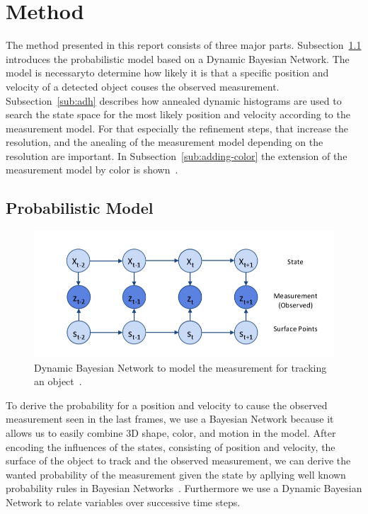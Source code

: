 \documentclass[twoside,a4paper,article]{combine}
\begin{document}
\section{Method}
\label{sec:method}
The method presented in this report consists of three major
parts. Subsection~\ref{sub:probabilistic-model} introduces the
probabilistic model based on a Dynamic Bayesian Network. The model is
necessaryto determine how likely it is that a specific position and
velocity of a detected object couses the observed
measurement. Subsection~\ref{sub:adh} describes how annealed dynamic
histograms are used to search the state space for the most likely
position and velocity according to the measurement model. For that
especially the refinement steps, that increase the resolution, and the
anealing of the measurement model depending on the resolution are
important. In Subsection~\ref{sub:adding-color} the extension of the
measurement model by color is shown~\cite{paper}.

\subsection{Probabilistic Model}
\label{sub:probabilistic-model}

\begin{figure}
  \center
  \includegraphics[width=.8\linewidth]{dbn}
  \caption{Dynamic Bayesian Network to model the measurement for
    tracking an object~\cite{paper}.}
  \label{fig:dbn}
\end{figure}

To derive the probability for a position and velocity to cause the
observed measurement seen in the last frames, we use a Bayesian
Network because it allows us to easily combine 3D shape, color, and
motion in the model. After encoding the influences of the states,
consisting of position and velocity, the surface of the object to
track and the observed measurement, we can derive the wanted
probability of the measurement given the state by apllying well known
probability rules in Bayesian Networks~\cite{ai-modern}. Furthermore
we use a Dynamic Bayesian Network to relate variables over successive
time steps.
\end{document}
